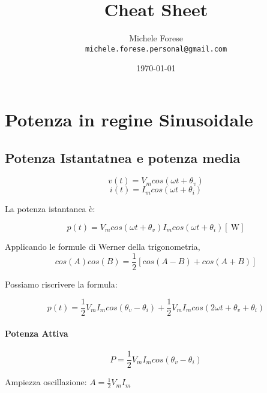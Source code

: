 \documentclass[12pt,titlepage,a4paper]{book}
\title{Cheat Sheet}
\author{Michele Forese\\
  \small{\texttt{michele.forese.personal@gmail.com}}
}
\date{\today}
\begin{document}
\maketitle



\pagebreak

\section{Potenza in regine Sinusoidale}
\subsection{Potenza Istantatnea e potenza media}


$$ v(t) = V_m cos(\omega t + \theta_v) $$
$$ i(t) = I_m cos(\omega t + \theta_i) $$

La potenza istantanea è:

\begin{equation*}
  p(t) = V_m cos(\omega t + \theta_v) I_m cos(\omega t + \theta_i) [\SI{}{\watt}]
\end{equation*}

Applicando le formule di Werner della trigonometria,
$$ cos(A)cos(B) = \frac{1}{2} [cos(A - B) + cos(A + B)] $$

Possiamo riscrivere la formula:

$$ p(t)=\frac{1}{2}V_mI_mcos(\theta_v - \theta_i) + \frac{1}{2}V_mI_mcos(2 \omega t + \theta_v + \theta_i) $$

\paragraph{Potenza Attiva}

$$ P = \frac{1}{2} V_m I_m cos(\theta_v - \theta_i) $$

\begin{center}
\end{center}

Ampiezza oscillazione: $ A = \frac{1}{2} V_m I_m $
\end{document}
